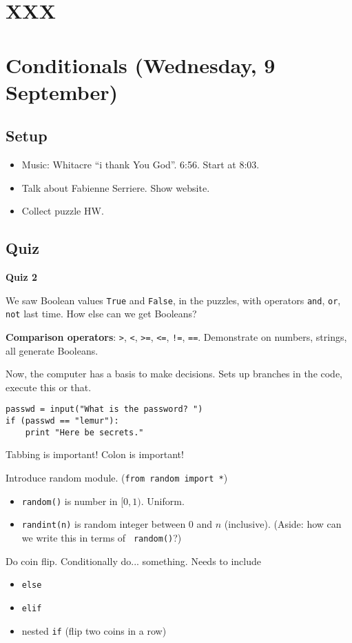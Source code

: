 \documentclass{article}
\begin{document}
\section{XXX}

\newpage
\section{Conditionals (Wednesday, 9 September)}

\subsection*{Setup}

\begin{itemize}
\item Music: Whitacre ``i thank You God''. 6:56.  Start at 8:03.
\item Talk about Fabienne Serriere.  Show website.
\item Collect puzzle HW.
\end{itemize}

\subsection*{Quiz}
\textbf{Quiz 2}

We saw Boolean values {\tt True} and {\tt False}, in the puzzles, with
operators {\tt and}, {\tt or}, {\tt not} last time.  How else can we get
Booleans?

\textbf{Comparison operators}: \verb|>|, \verb|<|, \verb|>=|,
\verb|<=|, \verb|!=|, \verb|==|.  Demonstrate on numbers, strings, all
generate Booleans.

Now, the computer has a basis to make decisions.  Sets up branches in
the code, execute this or that.

\begin{verbatim}
passwd = input("What is the password? ")
if (passwd == "lemur"):
    print "Here be secrets."
\end{verbatim}

Tabbing is important!  Colon is important!

Introduce random module. ({\tt from random import *})
\begin{itemize}
\item {\tt random()} is number in $[0,1)$. Uniform.
\item {\tt randint(n)} is random integer between $0$ and $n$
  (inclusive).  (Aside: how can we write this in terms of {\tt
    random()}?)
\end{itemize}
Do coin flip.  Conditionally do... something.  Needs to include
\begin{itemize}
\item {\tt else}
\item {\tt elif}
\item nested {\tt if}  (flip two coins in a row)
\end{itemize}
\end{document}
